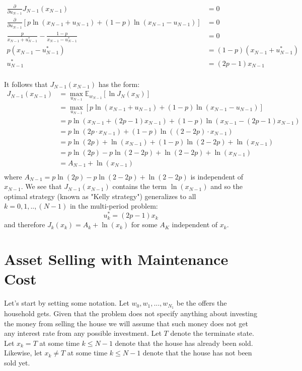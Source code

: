 \documentclass[11pt, oneside]{article}   	%
\begin{document}
\begin{align*}
\frac{\partial}{\partial u_{N-1}} J_{N-1}(x_{N-1}) &= 0\\
\frac{\partial}{\partial u_{N-1}} \left[ p \ln (x_{N-1} + u_{N-1}) + (1-p) \ln (x_{N-1} - u_{N-1})\right] &= 0\\
\frac{p}{x_{N-1} + u_{N-1}^*} - \frac{1-p}{x_{N-1} - u_{N-1}^*} &= 0\\
p(x_{N-1} - u_{N-1}^*) &= (1-p)(x_{N-1} + u_{N-1}^*)\\
u_{N-1}^* &= (2p-1)x_{N-1}\\
\end{align*}

It follows that $J_{N-1}(x_{N-1})$ has the form:
\begin{align*}
J_{N-1}(x_{N-1}) &=  \max_{u_{N-1}} \mathbb{E}_{w_{N-1}} \left[\ln J_{N} (x_{N}) \right]\\
&=  \max_{u_{N-1}} \left[ p \ln (x_{N-1} + u_{N-1}) + (1-p) \ln (x_{N-1} - u_{N-1})\right]\\
&=  p \ln (x_{N-1} + (2p-1)x_{N-1}) + (1-p) \ln (x_{N-1} - (2p-1)x_{N-1})\\
&=  p \ln (2p \cdot x_{N-1}) + (1-p) \ln ((2-2p) \cdot x_{N-1})\\
&=  p \ln (2p) + \ln(x_{N-1}) + (1-p) \ln (2-2p) + \ln(x_{N-1})\\
&=  p \ln (2p) - p\ln (2-2p) + \ln (2-2p) + \ln(x_{N-1})\\
&=  A_{N-1} + \ln(x_{N-1})\\
\end{align*}
where $A_{N-1} = p \ln (2p) - p\ln (2-2p) + \ln (2-2p)$ is independent of $x_{N-1}$. We see that $J_{N-1}(x_{N-1})$ contains the term $\ln(x_{N-1})$ and so the optimal strategy (known as "Kelly strategy") generalizes to all $k=0,1,..,(N-1)$ in the multi-period problem:
$$u_{k}^* = (2p-1)x_{k}$$
and therefore $J_k(x_k) = A_{k} + \ln(x_{k})$ for some $A_K$ independent of $x_k$.





\section{Asset Selling with Maintenance Cost}
Let's start by setting some notation. Let $w_{0},w_{1},...,w_{N_1}$ be the offers the household gets. Given that the problem does not specify anything about investing the money from selling the house we will assume that such money does not get any interest rate from any possible investment. Let $T$ denote the terminate state. Let $x_{k} = T$ at some time $k \leq N-1$ denote that the house has already been sold. Likewise, let $x_{k} \neq T$ at some time $k \leq N-1$ denote that the house has not been sold yet.\\
\end{document}
